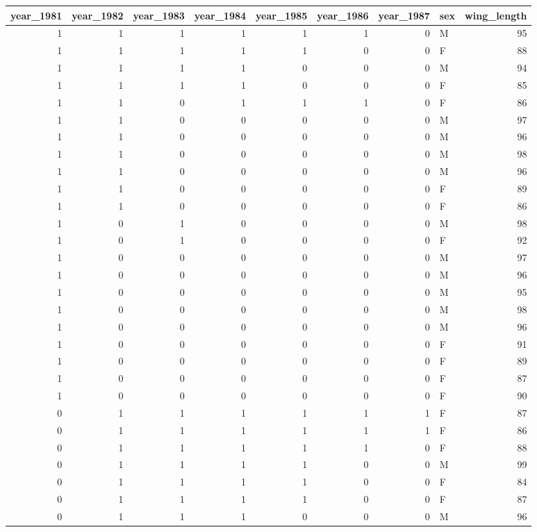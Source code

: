 \documentclass[
  12pt,
]{krantz}
\begin{document}
\begin{tabular}{r|r|r|r|r|r|r|l|r}
\hline
year\_1981 & year\_1982 & year\_1983 & year\_1984 & year\_1985 & year\_1986 & year\_1987 & sex & wing\_length\\
\hline
1 & 1 & 1 & 1 & 1 & 1 & 0 & M & 95\\
\hline
1 & 1 & 1 & 1 & 1 & 0 & 0 & F & 88\\
\hline
1 & 1 & 1 & 1 & 0 & 0 & 0 & M & 94\\
\hline
1 & 1 & 1 & 1 & 0 & 0 & 0 & F & 85\\
\hline
1 & 1 & 0 & 1 & 1 & 1 & 0 & F & 86\\
\hline
1 & 1 & 0 & 0 & 0 & 0 & 0 & M & 97\\
\hline
1 & 1 & 0 & 0 & 0 & 0 & 0 & M & 96\\
\hline
1 & 1 & 0 & 0 & 0 & 0 & 0 & M & 98\\
\hline
1 & 1 & 0 & 0 & 0 & 0 & 0 & M & 96\\
\hline
1 & 1 & 0 & 0 & 0 & 0 & 0 & F & 89\\
\hline
1 & 1 & 0 & 0 & 0 & 0 & 0 & F & 86\\
\hline
1 & 0 & 1 & 0 & 0 & 0 & 0 & M & 98\\
\hline
1 & 0 & 1 & 0 & 0 & 0 & 0 & F & 92\\
\hline
1 & 0 & 0 & 0 & 0 & 0 & 0 & M & 97\\
\hline
1 & 0 & 0 & 0 & 0 & 0 & 0 & M & 96\\
\hline
1 & 0 & 0 & 0 & 0 & 0 & 0 & M & 95\\
\hline
1 & 0 & 0 & 0 & 0 & 0 & 0 & M & 98\\
\hline
1 & 0 & 0 & 0 & 0 & 0 & 0 & M & 96\\
\hline
1 & 0 & 0 & 0 & 0 & 0 & 0 & F & 91\\
\hline
1 & 0 & 0 & 0 & 0 & 0 & 0 & F & 89\\
\hline
1 & 0 & 0 & 0 & 0 & 0 & 0 & F & 87\\
\hline
1 & 0 & 0 & 0 & 0 & 0 & 0 & F & 90\\
\hline
0 & 1 & 1 & 1 & 1 & 1 & 1 & F & 87\\
\hline
0 & 1 & 1 & 1 & 1 & 1 & 1 & F & 86\\
\hline
0 & 1 & 1 & 1 & 1 & 1 & 0 & F & 88\\
\hline
0 & 1 & 1 & 1 & 1 & 0 & 0 & M & 99\\
\hline
0 & 1 & 1 & 1 & 1 & 0 & 0 & F & 84\\
\hline
0 & 1 & 1 & 1 & 1 & 0 & 0 & F & 87\\
\hline
0 & 1 & 1 & 1 & 0 & 0 & 0 & M & 96\\

\end{tabular}
\end{document}
